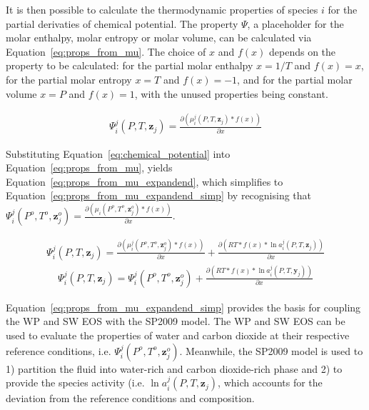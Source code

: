     It is then possible to calculate the thermodynamic properties of species \(i\) for the partial derivaties of chemical potential. The property \(\Psi\), a placeholder for the molar enthalpy, molar entropy or molar volume, can be calculated via Equation~\ref{eq:props_from_mu}. The choice of \(x\) and \(f(x)\) depends on the property to be calculated: for the partial molar enthalpy \(x=1/T\) and \(f(x)=x\), for the partial molar entropy \(x=T\) and \(f(x)=-1\), and for the partial molar volume \(x=P\) and \(f(x)=1\), with the unused properties being constant.

    \begin{align}
        \Psi_i^{j} (P, T, \mathbf{z}_j) = \frac{\partial \left( \mu_i^{j} (P, T, \mathbf{z}_j)*f(x) \right)}{\partial x} \label{eq:props_from_mu}
    \end{align}

    Substituting Equation~\ref{eq:chemical_potential} into Equation~\ref{eq:props_from_mu}, yields Equation~\ref{eq:props_from_mu_expandend}, which simplifies to Equation~\ref{eq:props_from_mu_expandend_simp} by recognising that \(\Psi_i^{j} (P^o, T^o, \mathbf{z}_j^o)=\frac{\partial \left( \mu_i (P^o, T^o, \mathbf{z}_j^o)*f(x) \right)}{\partial x}\).

    \begin{align}
        \Psi_i^{j} (P, T, \mathbf{z}_j) = \frac{\partial \left( \mu_i^{j} (P^o, T^o, \mathbf{z}_j^o)*f(x) \right)}{\partial x} + \frac{\partial \left(RT * f(x)* \ln a_i^{j} (P, T, \mathbf{z}_j) \right)}{\partial x} \label{eq:props_from_mu_expandend}
    \end{align}
    \begin{align}
        \Psi_i^{j} (P, T, \mathbf{z}_j) = \Psi_i^{j} (P^o, T^o, \mathbf{z}_j^o) + \frac{\partial \left(RT * f(x)* \ln a_i^{j} (P, T, \mathbf{y}_j) \right)}{\partial x} \label{eq:props_from_mu_expandend_simp}
    \end{align}

    Equation~\ref{eq:props_from_mu_expandend_simp} provides the basis for coupling the \ac{WP} and \ac{SW} \ac{EOS} with the \ac{SP2009} model. The \ac{WP} and \ac{SW} \ac{EOS} can be used to evaluate the properties of water and carbon dioxide at their respective reference conditions, i.e. \(\Psi_i^{j} (P^o, T^o, \mathbf{z}_j^o)\). Meanwhile, the \ac{SP2009} model is used to 1) partition the fluid into water-rich and carbon dioxide-rich phase and 2) to provide the species activity (i.e. \(\ln a_i^{j} (P, T, \mathbf{z}_j)\), which accounts for the deviation from the reference conditions and composition.

